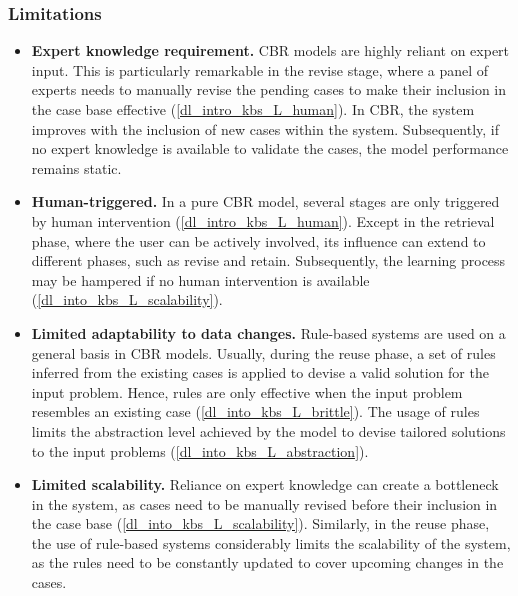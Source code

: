 \subsubsection*{Limitations}
\begin{itemize}
    \item \textbf{Expert knowledge requirement.} CBR models are highly reliant on expert input. This is particularly remarkable in the revise stage, where a panel of experts needs to manually revise the pending cases to make their inclusion in the case base effective (\ref{dl_intro_kbs_L_human}). In CBR, the system improves with the inclusion of new cases within the system. Subsequently, if no expert knowledge is available to validate the cases, the model performance remains static. 
    
    \item \textbf{Human-triggered.} In a pure CBR model, several stages are only triggered by human intervention (\ref{dl_intro_kbs_L_human}). Except in the retrieval phase, where the user can be actively involved, its influence can extend to different phases, such as revise and retain. Subsequently, the learning process may be hampered if no human intervention is available (\ref{dl_into_kbs_L_scalability}).
    
    \item \textbf{Limited adaptability to data changes.} Rule-based systems are used on a general basis in CBR models. Usually, during the reuse phase, a set of rules inferred from the existing cases is applied to devise a valid solution for the input problem. Hence, rules are only effective when the input problem resembles an existing case (\ref{dl_into_kbs_L_brittle}). The usage of rules limits the abstraction level achieved by the model to devise tailored solutions to the input problems (\ref{dl_into_kbs_L_abstraction}).
    
    \item \textbf{Limited scalability.} Reliance on expert knowledge can create a bottleneck in the system, as cases need to be manually revised before their inclusion in the case base (\ref{dl_into_kbs_L_scalability}). Similarly, in the reuse phase, the use of rule-based systems considerably limits the scalability of the system, as the rules need to be constantly updated to cover upcoming changes in the cases.
    
    
\end{itemize}

